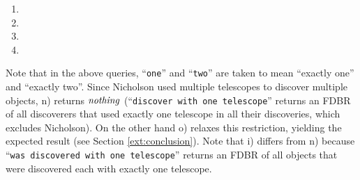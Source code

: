 \documentclass[../main.tex]{subfiles}
\begin{document}
\begin{refsection}
\begin{enumerate}[label=\alph*.]
\item {}

\item {}

\item {}

\item {}
\end{enumerate}

\examplespacing

Note that in the above queries, ``\texttt{one}'' and ``\texttt{two}'' are taken to mean ``exactly one'' and ``exactly two''. Since Nicholson used multiple telescopes to discover multiple objects, n) returns $\operatorname{\mathit{nothing}}$ (``\texttt{discover with one telescope}'' returns an FDBR of all discoverers that used exactly one telescope in all their discoveries, which excludes Nicholson). On the other hand o) relaxes this restriction, yielding the expected result (see Section \ref{ext:conclusion}).  Note that i) differs from n) because ``\texttt{was discovered with one telescope}'' returns an FDBR of all objects that were discovered each with exactly one telescope.


\end{refsection}
\end{document}
